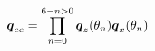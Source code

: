 \begin{equation}
  \centering
  \label{eq:ee_rotation}
  \vb*{q}_{ee} = \prod_{n=0}^{6-n>0}\vb*{q}_z(\theta_n)\vb*{q}_x(\theta_n)
\end{equation}

